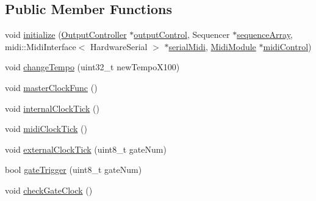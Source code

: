 \subsection*{Public Member Functions}
\begin{DoxyCompactItemize}
\item 
void \hyperlink{class_master_clock_aa7106b58216e1bc65dc88cdbba1d0514}{initialize} (\hyperlink{class_output_controller}{Output\+Controller} $\ast$\hyperlink{class_master_clock_a6ec5b571edf2361d6c02834dec70fc09}{output\+Control}, Sequencer $\ast$\hyperlink{class_master_clock_a5e1a8b89151a6f5698e0ee3a0923e7bb}{sequence\+Array}, midi\+::\+Midi\+Interface$<$ Hardware\+Serial $>$ $\ast$\hyperlink{class_master_clock_a4c93dc002c3c69bd93a4b694a9ae0834}{serial\+Midi}, \hyperlink{class_midi_module}{Midi\+Module} $\ast$\hyperlink{class_master_clock_ac38ecfe6fdbbe0d43fb7b09d32dd4999}{midi\+Control})
\item 
void \hyperlink{class_master_clock_a81cfc025162075b165cd8ff93da5489a}{change\+Tempo} (uint32\+\_\+t new\+Tempo\+X100)
\item 
void \hyperlink{class_master_clock_a6d2a014da8caf9c4f39917ce4c09b83d}{master\+Clock\+Func} ()
\item 
void \hyperlink{class_master_clock_a96924e6693fee4ac2f9994583d0f33ba}{internal\+Clock\+Tick} ()
\item 
void \hyperlink{class_master_clock_a9c19932a580f5c5797fd31a58dc1a410}{midi\+Clock\+Tick} ()
\item 
void \hyperlink{class_master_clock_ab64882eca80c7e2de0b9e57020661df9}{external\+Clock\+Tick} (uint8\+\_\+t gate\+Num)
\item 
bool \hyperlink{class_master_clock_a16c1149bcc96dbea9d57063ad7a65d17}{gate\+Trigger} (uint8\+\_\+t gate\+Num)
\item 
void \hyperlink{class_master_clock_a94e8a4d26a0bb028a132d7582d602f01}{check\+Gate\+Clock} ()
\end{DoxyCompactItemize}
